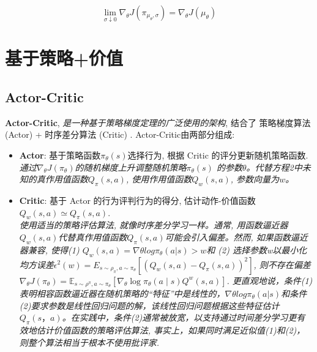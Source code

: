 \documentclass{article}
\begin{document}
            $$\lim _{\sigma \downarrow 0} \nabla_{\theta} J\left(\pi_{\mu_{\theta}, \sigma}\right)=\nabla_{\theta} J\left(\mu_{\theta}\right)$$

\section{基于策略+价值}
    \subsection{Actor-Critic}
        \textbf{Actor-Critic}, \textit{是一种基于策略梯度定理的广泛使用的架构}, 结合了 策略梯度算法 (Actor) + 时序差分算法 (Critic) . Actor-Critic由两部分组成:
    
        \begin{itemize}
            \item \textbf{Actor}: 基于策略函数$\pi_\theta(s)$选择行为, 根据 Critic 的评分更新随机策略函数. \\ \textit{通过$\nabla_{\theta} J\left(\pi_{\theta}\right)$的随机梯度上升调整随机策略$\pi_\theta(s)$ 的参数$\theta$。代替方程2中未知的真作用值函数$Q_\pi (s, a)$, 使用作用值函数$Q_w (s, a)$, 参数向量为$w$。}
            
            \item \textbf{Critic}: 基于 Actor 的行为评判行为的得分, 估计动作-价值函数$Q_w (s, a) \simeq  Q_\pi (s, a)$. \\ \textit{使用适当的策略评估算法, 就像时序差分学习一样。通常, 用函数逼近器$Q_w (s, a)$代替真作用值函数$Q_\pi (s, a)$可能会引入偏差。然而, 如果函数逼近器兼容, 使得(1) $Q_w (s, a) = \nabla \theta log \pi_\theta (a | s)>w$和 (2) 选择参数w以最小化均方误差$\epsilon^2 (w)=E_{s \sim \rho_\pi, a \sim \pi_\theta} [ (Q_w (s, a)− Q_\pi (s, a))^2]$, 则不存在偏差$\nabla_{\theta} J\left(\pi_{\theta}\right)=\mathbb{E}_{s \sim \rho^{\pi}, a \sim \pi_{\theta}}\left[\nabla_{\theta} \log \pi_{\theta}(a \mid s) Q^{w}(s, a)\right]$. 更直观地说，条件(1)表明相容函数逼近器在随机策略的“特征”中是线性的，$\nabla \theta log \pi_\theta (a | s)$和条件(2)要求参数是线性回归问题的解，该线性回归问题根据这些特征估计$Q_\pi(s，a)$。在实践中，条件(2)通常被放宽，以支持通过时间差分学习更有效地估计价值函数的策略评估算法, 事实上，如果同时满足近似值(1)和(2)，则整个算法相当于根本不使用批评家. }
        \end{itemize}
    
\end{document}
